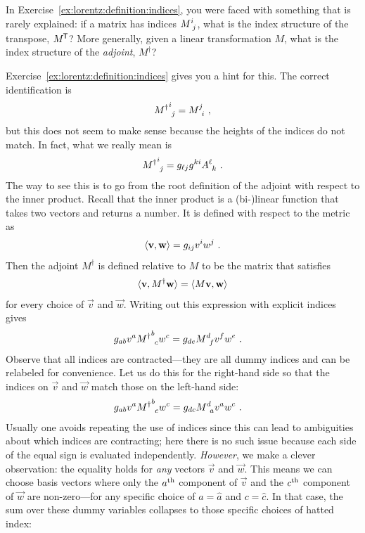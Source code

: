 \begin{example}
In Exercise~\ref{ex:lorentz:definition:indices}, you were faced with something that is rarely explained: if a matrix has indices $M\aij{i}{j}$, what is the index structure of the transpose, $M^{\mkern-1.5mu\mathsf{T}}$? More generally, given a linear transformation $M$, what is the index structure of the \emph{adjoint}, $M^\dag$? 

Exercise~\ref{ex:lorentz:definition:indices} gives you a hint for this. The correct identification is
\begin{align}
    {M^\dag}\aij{i}{j} = M\aij{j}{i} \ ,
\end{align}
but this does not seem to make sense because the heights of the indices do not match. In fact, what we really mean is
\begin{align}
    {M^\dag}\aij{i}{j} = g_{\ell j} g^{ki} A\aij{\ell}{k} \ .
    \label{eq:def:adjoint}
\end{align}
The way to see this is to go from the root definition of the adjoint with respect to the inner product. Recall that the inner product is a (bi-)linear function that takes two vectors and returns a number. It is defined with respect to the metric as
\begin{align}
    \langle \mathbf{v}, \mathbf{w} \rangle = g_{ij}v^iw^j \ .
\end{align}
Then the adjoint $M^\dag$ is defined relative to $M$ to be the matrix that satisfies
\begin{align}
    \langle \mathbf{v}, M^\dag \mathbf{w} \rangle = 
    \langle M \mathbf{v}, \mathbf{w} \rangle
\end{align}
for every choice of $\vec{v}$ and $\vec{w}$. Writing out this expression with explicit indices gives
\begin{align}
    g_{ab} v^a {M^\dag}\aij{b}{c} w^c
    &= 
    g_{de} M\aij{d}{f}v^f w^e 
    \ .
\end{align}
Observe that all indices are contracted---they are all dummy indices and can be relabeled for convenience. Let us do this for the right-hand side so that the indices on $\vec{v}$ and $\vec{w}$ match those on the left-hand side:
\begin{align}
    g_{ab} {v^a} {M^\dag}\aij{b}{c} {w^c}
    &= 
    g_{dc} M\aij{d}{a} {v^a} {w^c}
    \ .
\end{align}
Usually one avoids repeating the use of indices since this can lead to ambiguities about which indices are contracting; here there is no such issue because each side of the equal sign is evaluated independently. \emph{However}, we make a clever observation: the equality holds for \emph{any} vectors $\vec{v}$ and $\vec{w}$. This means we can choose basis vectors where only the $a^\textnormal{th}$ component of $\vec{v}$ and the $c^\textnormal{th}$ component of $\vec{w}$ are non-zero---for any specific choice of $a = \hat{a}$ and $c = \hat c$. In that case, the sum over these dummy variables collapses to those specific choices of hatted index:

\end{example}

